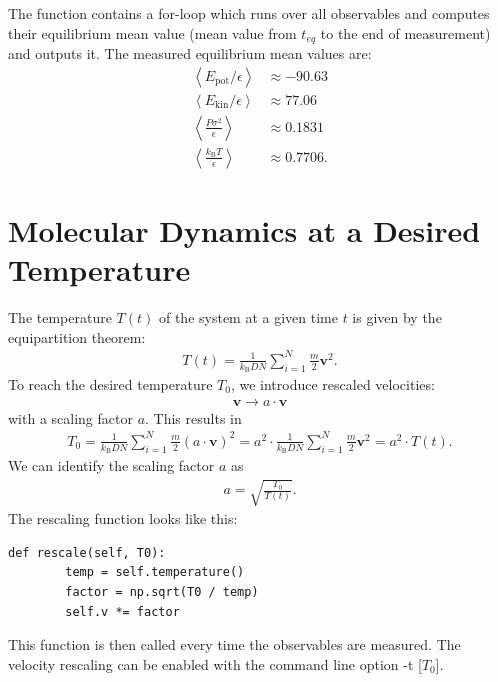 \documentclass[a4paper,10pt,bibtotoc]{scrartcl}
\begin{document}
The function contains a for-loop which runs over all observables and computes their equilibrium mean value (mean value from $t_{eq}$ to the end of measurement) and outputs it.
The measured equilibrium mean values are:
\begin{align*}
\left\langle E_\mathrm{pot}/\epsilon \right\rangle &\approx  -90.63\\
\left\langle E_\mathrm{kin}/\epsilon\right\rangle &\approx 77.06\\
\left\langle \frac{P\sigma ^2}{\epsilon}\right\rangle &\approx 0.1831\\
\left\langle \frac{k_\mathrm{B}T}{\epsilon}\right\rangle &\approx 0.7706.
\end{align*}

\newpage
\section{Molecular Dynamics at a Desired Temperature}
The temperature $T(t)$ of the system at a given time $t$ is given by the equipartition theorem:
\begin{align}
T(t) = \frac{1}{k_\mathrm{B}DN}\sum_{i=1}^{N}\frac{m}{2}\mathbf{v}^2.
\end{align}
To reach the desired temperature $T_0$, we introduce rescaled velocities:
\begin{align}
\mathbf{v}\rightarrow a\cdot\mathbf{v}
\end{align}
with a scaling factor $a$. 
This results in
\begin{align}
T_0 = \frac{1}{k_\mathrm{B}DN}\sum_{i=1}^{N}\frac{m}{2}\left(a\cdot\mathbf{v}\right)^2 =a^2\cdot \frac{1}{k_\mathrm{B}DN}\sum_{i=1}^{N}\frac{m}{2}\mathbf{v}^2 = a^2\cdot T(t).
\end{align}
We can identify the scaling factor $a$ as
\begin{align}
a = \sqrt{\frac{T_0}{T(t)}}.
\end{align}
The rescaling function looks like this:
\begin{lstlisting}
def rescale(self, T0):
        temp = self.temperature()
        factor = np.sqrt(T0 / temp)
        self.v *= factor
\end{lstlisting}
This function is then called every time the observables are measured. The velocity rescaling can be enabled with the command line option -t [$T_0$].
\end{document}
